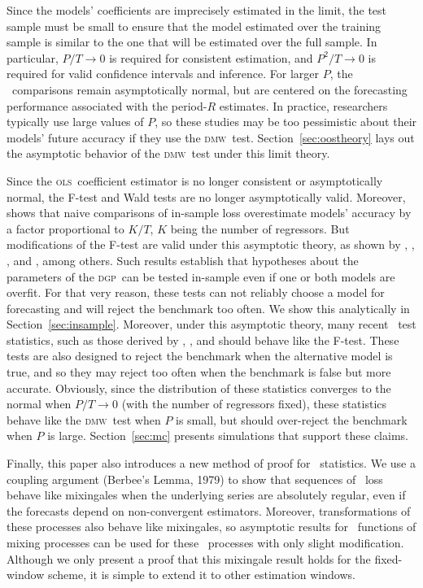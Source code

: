 \documentclass[11pt]{article}
\newcommand{\dmw}{\textsc{dmw}}
\newcommand{\ols}{\textsc{ols}}
\newcommand{\dgp}{\textsc{dgp}}
\begin{document}
Since the models' coefficients are imprecisely estimated in the limit,
the test sample must be small to ensure that the model estimated over
the training sample is similar to the one that will be estimated over
the full sample.  In particular, $P/T \to 0$ is required for
consistent estimation, and $P^2/T \to 0$ is required for valid
confidence intervals and inference.  For larger $P$, the \oos\
comparisons remain asymptotically normal, but are centered on the
forecasting performance associated with the period-$R$ estimates.  In
practice, researchers typically use large values of $P$, so these
studies may be too pessimistic about their models' future accuracy if
they use the \dmw\ test.  Section~\ref{sec:oostheory} lays out the
asymptotic behavior of the \dmw\ test under this limit theory.

Since the \ols\ coefficient estimator is no longer consistent or
asymptotically normal, the F-test and Wald tests are no longer
asymptotically valid.  Moreover, \citet{Efr:86,Efr:04} shows that
naive comparisons of in-sample loss overestimate models' accuracy by a
factor proportional to $K/T$, $K$ being the number of regressors.  But
modifications of the F-test are valid under this asymptotic theory, as
shown by \citet{BoB:95}, \citet{AkA:00}, \citet{AkP:04}, and
\citet{Cal:10b}, among others.  Such results establish that hypotheses
about the parameters of the \dgp\ can be tested in-sample even if one
or both models are overfit.  For that very reason, these tests can not
reliably choose a model for forecasting and will reject the benchmark
too often.  We show this analytically in Section~\ref{sec:insample}.
Moreover, under this asymptotic theory, many recent \oos\ test
statistics, such as those derived by \cite{ClM:01,ClM:05},
\citet{Mcc:07}, and \citet{ClW:06,ClW:07} should behave like the
F-test.  These tests are also designed to reject the benchmark when
the alternative model is true, and so they may reject too often when
the benchmark is false but more accurate.  Obviously, since the
distribution of these statistics converges to the normal when $P/T \to
0$ (with the number of regressors fixed), these statistics behave
like the \dmw\ test when $P$ is small, but should over-reject the
benchmark when $P$ is large.  Section~\ref{sec:mc} presents
simulations that support these claims.

Finally, this paper also introduces a new method of proof for \oos\
statistics.  We use a coupling argument (Berbee's Lemma, 1979) to show
that sequences of \oos\ loss behave like mixingales when the
underlying series are absolutely regular, even if the forecasts depend
on non-convergent estimators.  Moreover, transformations of these
processes also behave like mixingales, so asymptotic results for \ned\
functions of mixing processes can be used for these \oos\ processes
with only slight modification.  Although we only present a proof that
this mixingale result holds for the fixed-window scheme, it is simple
to extend it to other estimation windows.
\end{document}
